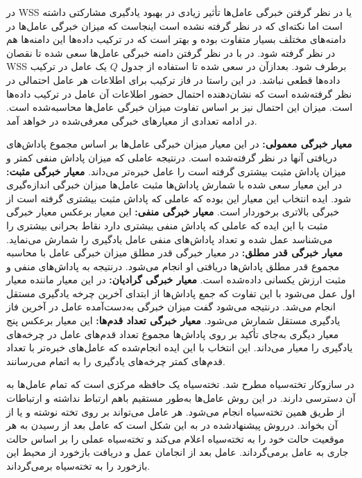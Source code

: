 در WSS یا در نظر گرفتن خبرگی عامل‌ها تأثیر زیادی در بهبود یادگیری مشارکتی داشته است اما نکته‌ای که در نظر گرفته نشده است اینجاست که میزان خبرگی عامل‌ها در دامنه‌های مختلف بسیار متفاوت بوده و بهتر است که در ترکیب داده‌ها این دامنه‌ها هم در نظر گرفته شود. در  با در نظر گرفتن دامنه خبرگی عامل‌ها سعی شده تا نقصان WSS برطرف شود. بعدازآن در سعی شده تا استفاده از جدول $Q$ یک عامل در ترکیب داده‌ها قطعی نباشد. در این راستا در فاز ترکیب برای اطلاعات هر عامل احتمالی در نظر گرفته‌شده است که نشان‌دهنده احتمال حضور اطلاعات آن عامل در ترکیب داده‌ها است. میزان این احتمال نیز بر اساس تفاوت میزان خبرگی عامل‌ها محاسبه‌شده است. در ادامه تعدادی از معیارهای خبرگی معرفی‌شده در خواهد آمد.
\begin{itemize}
 \textbf{معیار خبرگی معمولی:} در این معیار میزان خبرگی عامل‌ها بر اساس مجموع پاداش‌های دریافتی آنها در نظر گرفته‌شده است. درنتیجه عاملی که میزان پاداش منفی کمتر و میزان پاداش مثبت بیشتری گرفته است را عامل خبره‌تر می‌داند.
 \textbf{معیار خبرگی مثبت:} در این معیار سعی شده با شمارش پاداش‌ها مثبت عامل‌ها میزان خبرگی اندازه‌گیری شود. ایده انتخاب این معیار این بوده که عاملی که پاداش مثبت بیشتری گرفته است از خبرگی بالاتری برخوردار است.
 \textbf{معیار خبرگی منفی:} این معیار برعکس معیار خبرگی مثبت با این ایده که عاملی که پاداش منفی بیشتری دارد نقاط بحرانی بیشتری را می‌شناسد عمل شده و تعداد پاداش‌های منفی عامل یادگیری را شمارش می‌نماید.
 \textbf{معیار خبرگی قدر مطلق:} در معیار خبرگی قدر مطلق میزان خبرگی عامل با محاسبه مجموع قدر مطلق پاداش‌ها دریافتی او انجام می‌شود. درنتیجه به پاداش‌های منفی و مثبت ارزش یکسانی داده‌شده است.
 \textbf{معیار خبرگی گرادیان:} در این معیار ماننده معیار اول عمل می‌شود با این تفاوت که جمع پاداش‌ها از ابتدای آخرین چرخه یادگیری مستقل انجام می‌شد. درنتیجه می‌شود گفت میزان خبرگی به‌دست‌آمده عامل در آخرین فاز یادگیری مستقل شمارش می‌شود.
 \textbf{معیار خبرگی تعداد قدم‌ها:} این معیار برعکس پنج معیار دیگری به‌جای تأکید بر روی پاداش‌ها مجموع تعداد قدم‌های عامل در چرخه‌های یادگیری را معیار می‌داند. این انتخاب با این ایده انجام‌شده که عامل‌های خبره‌تر با تعداد قدم‌های کمتر چرخه‌های یادگیری را به اتمام می‌رسانند.
\end{itemize}

در سازوکار تخته‌سیاه مطرح شد. تخته‌سیاه یک حافظه مرکزی است که تمام عامل‌ها به آن دسترسی دارند. در این روش عامل‌ها به‌طور مستقیم باهم ارتباط نداشته و ارتباطات از طریق همین تخته‌سیاه انجام می‌شود. هر عامل می‌تواند بر روی تخته نوشته و یا از آن بخواند.
درروش پیشنهادشده در به این شکل است که عامل بعد از رسیدن به هر موقعیت حالت خود را به تخته‌سیاه اعلام می‌کند و تخته‌سیاه عملی را بر اساس حالت جاری به عامل برمی‌گرداند. عامل بعد از انجامان عمل و دریافت بازخورد از محیط این بازخورد را به تخته‌سیاه برمی‌گرداند.

